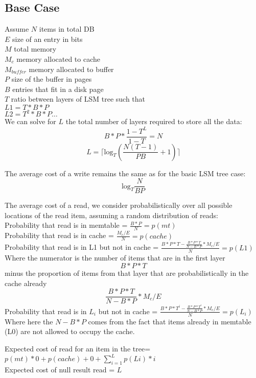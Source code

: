\documentclass[11pt]{article}
\theoremstyle{plain}
\theoremstyle{definition}
\begin{document}
\subsection{Base Case}

Assume
$N$ items in total DB \\
$E$ size of an entry in bits \\
$M$ total memory \\
$M_c$ memory allocated to cache \\
$M_{buffer}$ memory allocated to buffer\\
$P$ size of the buffer in pages \\
$B$ entries that fit in a disk page \\
$T$ ratio between layers of LSM tree such that \\
$L1 = T * B* P$ \\
$L2 = T^2 * B*P \dots$ \\ 

We can solve for $L$ the total number of layers required to store all the data: \\
$$B*P * \frac{1-T^L}{1-T} = N$$
$$L= \lceil \textrm{log}_{T} \left(\frac{N(T-1)}{PB} + 1\right) \rceil$$

The average cost of a write remains the same as for the basic LSM tree case:
$$
\textrm{log}_{T} \frac{N}{BP}
$$

The average cost of a read, we consider probabilistically over all possible locations of the read item, assuming a random distribution of reads: \\
Probability that read is in memtable = $\frac{B*P}{N}  = p(mt)$\\
Probability that read is in cache = $\frac{M_c/E}{N} = p(cache)$ \\
Probability that read is in L1 but not in cache = $ \frac{B*P * T - \frac{B*P*T}{N-B*P} * M_c/E}{N}  = p(L1)$\\
Where the numerator is the number of items that are in the first layer $$B*P*T$$ minus the proportion of items from that layer that are probabilistically in the cache already $$\frac{B*P*T}{N-B*P} * M_c/E$$
Probability that read is in $L_i$ but not in cache = $ \frac{B*P*T^i - \frac{B*P*T^i}{N-B*P} * M_c/E}{N}  = p(L_i)$\\
Where here the $N-B*P$ comes from the fact that items already in memtable (L0) are not allowed to occupy the cache.

Expected cost of read for an item in the tree= $p(mt) * 0  + p(cache) + 0 + \sum_{i=1}^L p(Li) * i$ \\
Expected cost of null result read = $L$ \\
\end{document}
